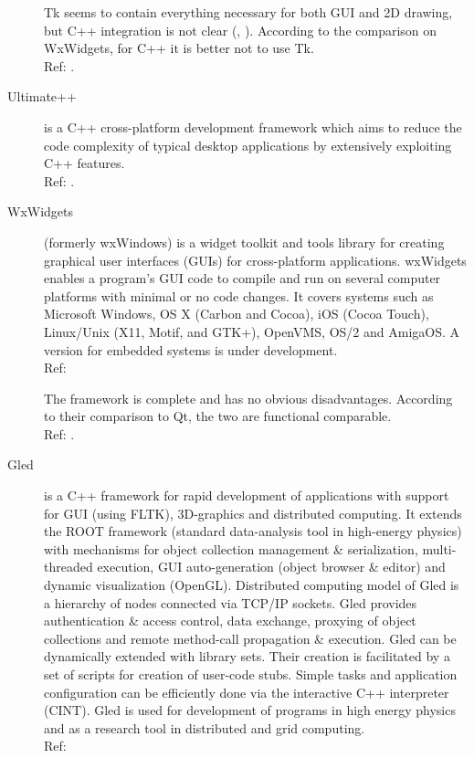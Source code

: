 \begin{description}
		Tk seems to contain everything necessary for both GUI and 2D drawing,
		but C++ integration is not clear (\cite{wiki:tk}, \cite{tcltk:tk}).
		According to the comparison on WxWidgets, for C++ it is better not to
		use Tk.  \hspace*{\fill}\\Ref: \cite{wxwidget:comparison}. 

    \item[Ultimate++] is a C++ cross-platform development framework which aims
		to reduce the code complexity of typical desktop applications
		by extensively exploiting C++ features.
		\hspace*{\fill}\\Ref: \cite{wiki:ultimate++}.

    \item[WxWidgets] (formerly wxWindows) is a widget toolkit and tools library
		for creating graphical user interfaces (GUIs) for cross-platform
		applications. wxWidgets enables a program's GUI code to compile
		and run on several computer platforms with minimal or no code
		changes. It covers systems such as Microsoft Windows, OS X
		(Carbon and Cocoa), iOS (Cocoa Touch), Linux/Unix (X11, Motif,
		and GTK+), OpenVMS, OS/2 and AmigaOS. A version for embedded
		systems is under development.
		\hspace*{\fill}\\Ref: \cite{wiki:wxwidget}

		The framework is complete and has no obvious disadvantages. According
		to their comparison to Qt, the two are functional comparable.
		\hspace*{\fill}\\Ref: \cite{wxwidget:comparison}.  

	\item[Gled]	is a C++ framework for rapid development of applications with
		support for GUI (using FLTK), 3D-graphics and distributed
		computing. It extends the ROOT framework (standard data-analysis
		tool in high-energy physics) with mechanisms for object collection
		management \& serialization, multi-threaded execution, GUI
		auto-generation (object browser \& editor) and dynamic visualization
		(OpenGL). Distributed computing model of Gled is a hierarchy of
		nodes connected via TCP/IP sockets. Gled provides authentication \&
		access control, data exchange, proxying of object collections and
		remote method-call propagation \& execution. Gled can be dynamically
		extended with library sets. Their creation is facilitated by a set
		of scripts for creation of user-code stubs. Simple tasks and
		application configuration can be efficiently done via the
		interactive C++ interpreter (CINT). Gled is used for development of
		programs in high energy physics and as a research tool in
		distributed and grid computing. 
		\hspace*{\fill}\\Ref: \cite{fltk:gled}


\end{description}
